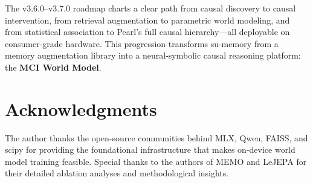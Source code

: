 \documentclass[11pt,a4paper]{article}
\begin{document}
The v3.6.0--v3.7.0 roadmap charts a clear path from causal discovery to causal intervention, from retrieval augmentation to parametric world modeling, and from statistical association to Pearl's full causal hierarchy---all deployable on consumer-grade hardware. This progression transforms su-memory from a memory augmentation library into a neural-symbolic causal reasoning platform: the \textbf{MCI World Model}.

\section*{Acknowledgments}
The author thanks the open-source communities behind MLX, Qwen, FAISS, and scipy for providing the foundational infrastructure that makes on-device world model training feasible. Special thanks to the authors of MEMO and LeJEPA for their detailed ablation analyses and methodological insights.
\end{document}
